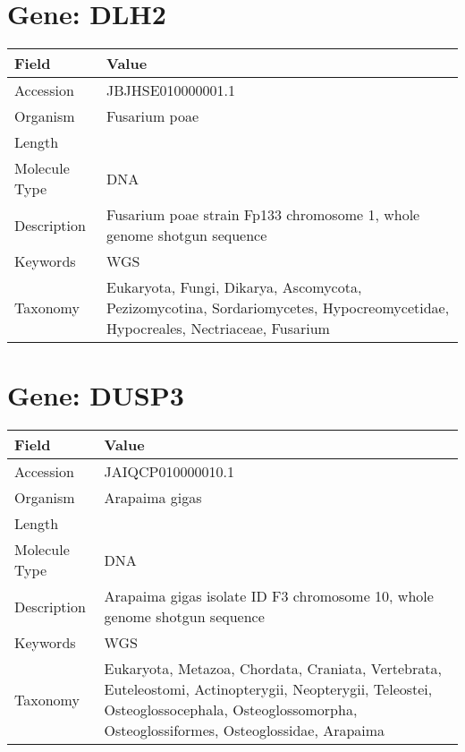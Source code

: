 \documentclass[10pt]{article}
\begin{document}
\section{Gene: DLH2}
{\footnotesize
\begin{longtable}{>{\raggedright\arraybackslash}p{4.5cm} >{\raggedright\arraybackslash}p{11.5cm}}
\textbf{Field} & \textbf{Value} \\
\hline
Accession & JBJHSE010000001.1 \\
Organism & Fusarium poae \\
Length & 12048428 \\
Molecule Type & DNA \\
Description & Fusarium poae strain Fp133 chromosome 1, whole genome shotgun sequence \\
Keywords & WGS \\
Taxonomy & Eukaryota, Fungi, Dikarya, Ascomycota, Pezizomycotina, Sordariomycetes, Hypocreomycetidae, Hypocreales, Nectriaceae, Fusarium \\
\end{longtable}
}

\vspace{1em}
\section{Gene: DUSP3}
{\footnotesize
\begin{longtable}{>{\raggedright\arraybackslash}p{4.5cm} >{\raggedright\arraybackslash}p{11.5cm}}
\textbf{Field} & \textbf{Value} \\
\hline
Accession & JAIQCP010000010.1 \\
Organism & Arapaima gigas \\
Length & 26053404 \\
Molecule Type & DNA \\
Description & Arapaima gigas isolate ID F3 chromosome 10, whole genome shotgun sequence \\
Keywords & WGS \\
Taxonomy & Eukaryota, Metazoa, Chordata, Craniata, Vertebrata, Euteleostomi, Actinopterygii, Neopterygii, Teleostei, Osteoglossocephala, Osteoglossomorpha, Osteoglossiformes, Osteoglossidae, Arapaima \\
\end{longtable}
}

\vspace{1em}
\end{document}

